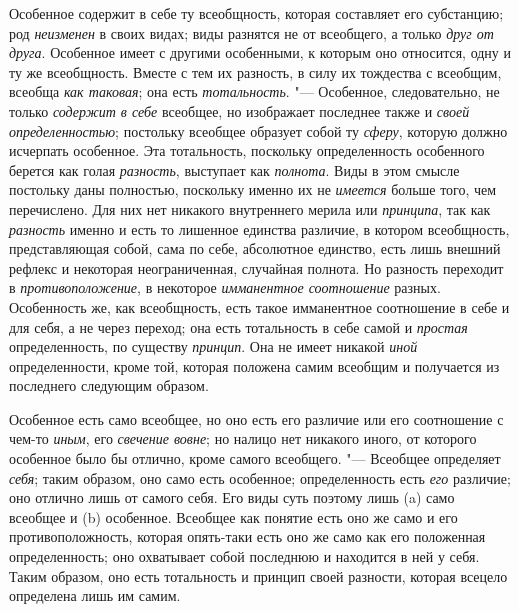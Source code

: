 {Особенное содержит в себе ту всеобщность, которая составляет
его субстанцию; род {\em неизменен}
в своих видах; виды разнятся не от всеобщего, а только
{\em друг от друга}.
Особенное имеет с другими особенными, к которым оно
относится, одну и ту же всеобщность. Вместе с тем их
разность,
в силу их тождества с всеобщим, всеобща
{\em как таковая}; она
есть {\em тотальность}. "---
Особенное, следовательно, не только
{\em содержит в себе}
всеобщее, но изображает последнее также и
{\em своей определенностью};
постольку всеобщее образует собой ту
{\em сферу}, которую
должно исчерпать особенное. Эта тотальность, поскольку определенность
особенного берется как голая
{\em разность}, выступает
как {\em полнота}. Виды в
этом смысле постольку даны полностью, поскольку именно их не
{\em имеется} больше
того, чем перечислено. Для них нет никакого внутреннего мерила или
{\em принципа}, так как
{\em разность} именно и
есть то лишенное единства различие, в котором всеобщность, представляющая
собой, сама по себе, абсолютное единство, есть лишь внешний рефлекс и
некоторая неограниченная, случайная полнота. Но разность переходит в
{\em противоположение}, в
некоторое {\em имманентное соотношение}
разных. Особенность же, как всеобщность, есть такое
имманентное соотношение в себе и для себя, а не через переход; она есть
тотальность в себе самой и
{\em простая}
определенность, по существу
{\em принцип}. Она не
имеет никакой {\em иной}
определенности, кроме той, которая положена самим всеобщим и
получается из последнего следующим образом.

Особенное есть само всеобщее, но оно есть его различие или его
соотношение с чем-то {\em иным},
его {\em свечение
вовне}; но налицо нет никакого иного, от которого
особенное было бы отлично, кроме самого всеобщего. "---
Всеобщее определяет
{\em себя}; таким
образом, оно само есть особенное; определенность есть
{\em его} различие; оно
отлично лишь от самого себя. Его виды суть поэтому лишь (a)
само всеобщее и (b) особенное. Всеобщее как понятие есть оно
же само и его противоположность, которая опять-таки есть оно же само как
его положенная определенность; оно охватывает собой последнюю и находится в
ней у себя. Таким образом, оно есть тотальность и принцип своей разности,
которая всецело определена лишь им самим.

}
